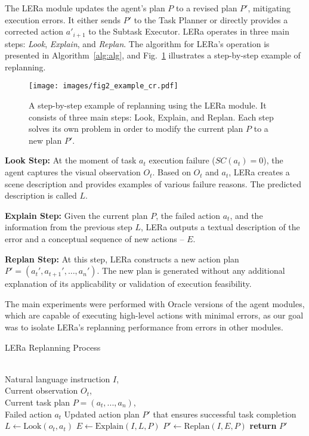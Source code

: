 \documentclass[letterpaper, 10 pt, conference]{ieeeconf}  %
\begin{document}
The LERa module updates the agent’s plan $P$ to a revised plan $P'$, mitigating execution errors. It either sends $P'$ to the Task Planner or directly provides a corrected action $a'_{i+1}$ to the Subtask Executor. LERa operates in three main steps: \textit{Look}, \textit{Explain}, and \textit{Replan}. The algorithm for LERa's operation is presented in Algorithm~\ref{alg:alg}, and Fig.~\ref{fig:replan} illustrates a step-by-step example of replanning.

\begin{figure}[t]
    \centering
\texttt{[image: images/fig2\_example\_cr.pdf]}
\vspace{-10pt}
    \caption{A step-by-step example of replanning using the LERa module. It consists of three main steps: Look, Explain, and Replan. Each step solves its own problem in order to modify the current plan $P$ to a new plan $P'$.}
    \label{fig:replan}
    \vspace{-15pt}
\end{figure}

\textbf{Look Step:} At the moment of task $a_t$ execution failure ($SC(a_t) = 0$), the agent captures the visual observation $O_t$. Based on $O_t$ and $a_t$, LERa creates a scene description and provides examples of various failure reasons. The predicted description is called $L$.  

\textbf{Explain Step:} Given the current plan $P$, the failed action $a_t$, and the information from the previous step $L$, LERa outputs a textual description of the error and a conceptual sequence of new actions -- $E$.  

\textbf{Replan Step:} At this step, LERa constructs a new action plan $P' = (a_t', a_{t+1}', \dots, a_n')$. The new plan is generated without any additional explanation of its applicability or validation of execution feasibility.  

The main experiments were performed with Oracle versions of the agent modules, which are capable of executing high-level actions with minimal errors, as our goal was to isolate LERa's replanning performance from errors in other modules.
\begin{algorithm}[h]
\caption{LERa Replanning Process}
\begin{algorithmic}[1]
\Require \\
    Natural language instruction $I$, \\
    Current observation $O_t$, \\
    Current task plan $P = (a_t, ...,a_n)$, \\
    Failed action $a_t$
\Ensure Updated action plan $P'$ that ensures successful task completion
\State $L \leftarrow \text{Look}(o_t, a_t)$ 
\State $E \leftarrow \text{Explain}(I,  L, P)$ 
\State $P' \leftarrow \text{Replan}(I,  E, P)$ 
\State \textbf{return} $P'$
\end{algorithmic}
\label{alg:alg}
\end{algorithm}
\vspace{-10pt}
\end{document}
